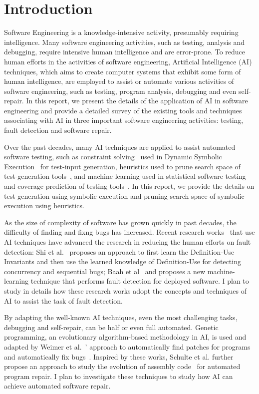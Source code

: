 \section{Introduction} 
Software Engineering is a knowledge-intensive activity, presumably requiring intelligence. Many software engineering activities, such as testing, analysis and debugging, require intensive human intelligence and are error-prone. To reduce human efforts in the activities of software engineering, Artificial Intelligence (AI) techniques, which aims to create computer systems that exhibit some form of human intelligence, are employed to assist or automate various activities of software engineering, such as testing, program analysis, debugging and even self-repair. In this report, we present the details of the application of AI in software engineering and provide a detailed survey of the existing tools and techniques associating with AI in three important software engineering activities: testing, fault detection and software repair.

Over the past decades, many AI techniques are applied to assist automated software testing, such as constraint solving~\cite{constraintsolving} used in Dynamic Symbolic Execution~\cite{symbolic, dart, cute} for test-input generation, heuristics used to prune search space of test-generation tools~\cite{prune,fitness}, and machine learning used in statistical software testing~\cite{mlinstatistics} and coverage prediction of testing tools~\cite{predictCoverage}. In this report, we provide the details on test generation using symbolic execution and pruning search space of symbolic execution using heuristics.

As the size of complexity of software has grown quickly in past decades, the difficulty of finding and fixng bugs has increased. Recent research works~\cite{wrongDefinition,online} that use AI techniques have advanced the research in reducing the human efforts on fault detection: Shi et al.~\cite{wrongDefinition} proposes an approach to first learn the Definition-Use Invariants and then use the learned knowledge of Definition-Use for detecting concurrency and sequential bugs; Baah et al~\cite{online} and proposes a new machine-learning technique that performs fault detection for deployed software. I plan to study in details how these research works adopt the concepts and techniques of AI to assist the task of fault detection.

By adapting the well-known AI techniques, even the most challenging tasks, debugging and self-repair, can be half or even full automated. Genetic programming, an evolutionary algorithm-based methodology in AI, is used and adapted by Weimer et al.~\cite{geneticPatch}' approach to automatically find patches for programs and automatically fix bugs~\cite{repair}. Inspired by these works, Schulte et al. further propose an approach to study the evolution of assembly code~\cite{evolutionaryComputation} for automated program repair. I plan to investigate these techniques to study how AI can achieve automated software repair.



